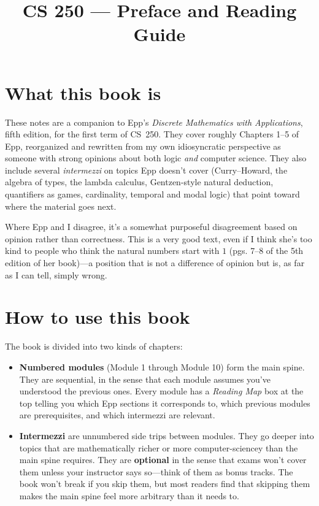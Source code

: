 \documentclass[11pt]{article}
\title{CS 250 --- Preface and Reading Guide}
\author{}
\date{}
\begin{document}
\maketitle

\section*{What this book is}

These notes are a companion to Epp's \emph{Discrete Mathematics with Applications}, fifth edition, for the first term of CS~250. They cover roughly Chapters 1--5 of Epp, reorganized and rewritten from my own idiosyncratic perspective as someone with strong opinions about both logic \emph{and} computer science. They also include several \emph{intermezzi} on topics Epp doesn't cover (Curry--Howard, the algebra of types, the lambda calculus, Gentzen-style natural deduction, quantifiers as games, cardinality, temporal and modal logic) that point toward where the material goes next.

Where Epp and I disagree, it's a somewhat purposeful disagreement based on opinion rather than correctness. This is a very good text, even if I think she's too kind to people who think the natural numbers start with $1$ (pgs. 7--8 of the 5th edition of her book)---a position that is not a difference of opinion but is, as far as I can tell, simply wrong.
\section*{How to use this book}

The book is divided into two kinds of chapters:

\begin{itemize}
  \item \textbf{Numbered modules} (Module 1 through Module 10) form the main spine. They are sequential, in the sense that each module assumes you've understood the previous ones. Every module has a \emph{Reading Map} box at the top telling you which Epp sections it corresponds to, which previous modules are prerequisites, and which intermezzi are relevant.
  \item \textbf{Intermezzi} are unnumbered side trips between modules. They go deeper into topics that are mathematically richer or more computer-sciencey than the main spine requires. They are \textbf{optional} in the sense that exams won't cover them unless your instructor says so---think of them as bonus tracks. The book won't break if you skip them, but most readers find that skipping them makes the main spine feel more arbitrary than it needs to.
\end{itemize}
\end{document}
